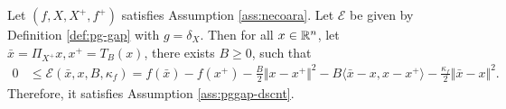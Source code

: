 \documentclass[12pt]{article}
\begin{document}
        \begin{proposition}\label{prop:qscnvx-ass-ok}
            Let $(f, X, X^+, f^+)$ satisfies Assumption \ref{ass:necoara}.
            Let $\mathcal E$ be given by Definition \ref{def:pg-gap} with $g = \delta_X$. 
            Then for all $x \in \mathbb R^n$, let $\bar x = \Pi_{X^+}x, x^+ = T_B(x)$, there exists $B \ge 0$, such that 
            \begin{align*}
                0 &\le 
                \mathcal E(\bar x, x, B, \kappa_f)
                = 
                f(\bar x) - f(x^+) 
                - \frac{B}{2}\Vert x - x^+\Vert^2 
                - B\langle \bar x - x, x - x^+\rangle
                - \frac{\kappa_f}{2}\Vert \bar x - x\Vert^2. 
            \end{align*}
            Therefore, it satisfies Assumption \ref{ass:pggap-dscnt}. 
        \end{proposition}
\end{document}
